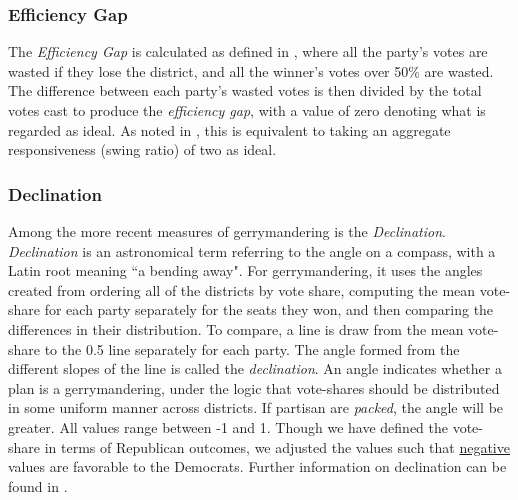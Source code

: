             \subsubsection*{Efficiency Gap}
    The \textit{Efficiency Gap} is calculated as defined in \citet{Stephanopoulos2014_UofChicagoLaw}, where all the party’s votes are wasted if they lose the district, and all the winner’s votes over 50\% are wasted. The difference between each party’s wasted votes is then divided by the total votes cast to produce the \textit{efficiency gap}, with a value of zero denoting what is regarded as ideal. As noted in \citet[][p. 13]{Best2018}, this is equivalent to taking an aggregate responsiveness (swing ratio) of two as ideal. 
\par
            \subsubsection*{Declination}
    Among the more recent measures of gerrymandering is the \textit{Declination}. \textit{Declination} is an astronomical term referring to the angle on a compass, with a Latin root meaning ``a bending away". For gerrymandering, it uses the angles created from ordering all of the districts by vote share, computing the mean vote-share for each party separately for the seats they won, and then comparing the differences in their distribution. To compare, a line is draw from the mean vote-share to the 0.5 line separately for each party. The angle formed from the different slopes of the line is called the \textit{declination}. An angle indicates whether a plan is a gerrymandering, under the logic that vote-shares should be distributed in some uniform manner across districts. If partisan are \textit{packed}, the angle will be greater. All values range between -1 and 1. Though we have defined the vote-share in terms of Republican outcomes, we adjusted the values such that \underline{negative} values are favorable to the Democrats. Further information on declination can be found in \citet{Warrington2018}.  
\par
